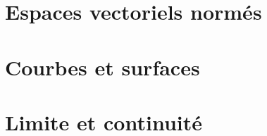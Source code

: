 
\section{Espaces vectoriels normés}




\section{Courbes et surfaces}



\section{Limite et continuité}



